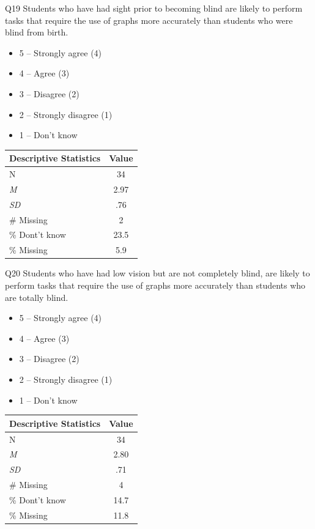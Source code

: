 \documentclass[11.5pt]{sig-alternate} %
\begin{document}
\begin{large}
Q19 Students who have had sight prior to becoming blind are likely to perform tasks that require the use of graphs more accurately than students who were blind from birth.
 \begin{itemize}
     \item 5 – Strongly agree (4)
     \item 4 – Agree (3)
     \item 3 – Disagree (2)
     \item 2 – Strongly disagree (1)
     \item 1 – Don’t know
 \end{itemize}
\begin{table}[h]
\centering
\begin{tabular}{lc}
Descriptive Statistics & Value\\ \hline
N  & 34 \\
\textit{M} &	2.97\\
\textit{SD}	& .76\\
\# Missing &	2\\
\% Dont't know & 23.5\\
\% Missing & 5.9\\
\end{tabular}
\end{table}

\newpage
Q20 Students who have had low vision but are not completely blind, are likely to perform tasks that require the use of graphs more accurately than students who are totally blind.
 \begin{itemize}
     \item 5 – Strongly agree (4)
     \item 4 – Agree (3)
     \item 3 – Disagree (2)
     \item 2 – Strongly disagree (1)
     \item 1 – Don’t know
 \end{itemize}
\begin{table}[h]
\centering
\begin{tabular}{lc}
Descriptive Statistics & Value\\ \hline
N  & 34 \\
\textit{M} &	2.80\\
\textit{SD}	& .71\\
\# Missing &	4\\
\% Dont't know & 14.7\\
\% Missing & 11.8\\
\end{tabular}
\end{table}

\end{large}
\end{document}

